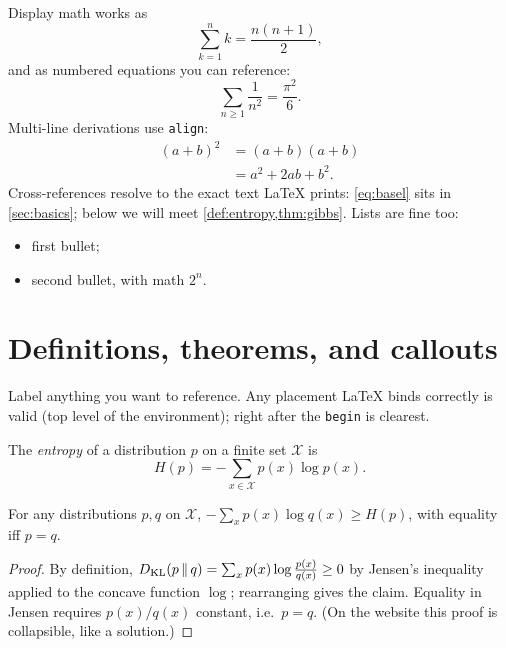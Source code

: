 Display math works as \, \[ \sum_{k=1}^{n} k = \frac{n(n+1)}{2}, \]
and as numbered equations you can reference:
\begin{equation}
  \label{eq:basel}
  \sum_{n \geq 1} \frac{1}{n^2} = \frac{\pi^2}{6}.
\end{equation}
Multi-line derivations use \texttt{align}:
\begin{align}
  (a+b)^2 &= (a+b)(a+b) \\
          &= a^2 + 2ab + b^2.
\end{align}
Cross-references resolve to the exact text LaTeX prints: \cref{eq:basel} sits
in \cref{sec:basics}; below we will meet \cref{def:entropy,thm:gibbs}. Lists
are fine too:
\begin{itemize}
  \item first bullet;
  \item second bullet, with math $2^n$.
\end{itemize}

\section{Definitions, theorems, and callouts}
\label{sec:results}

Label anything you want to reference. Any placement \LaTeX{} binds correctly
is valid (top level of the environment); right after the \texttt{begin} is
clearest.

\begin{definition}[entropy]
\label{def:entropy}
The \emph{entropy} of a distribution $p$ on a finite set $\mathcal{X}$ is
\[ H(p) = -\sum_{x \in \mathcal{X}} p(x) \log p(x). \]
\end{definition}

\begin{theorem}
\label{thm:gibbs}
For any distributions $p, q$ on $\mathcal{X}$,
$-\sum_x p(x) \log q(x) \geq H(p)$, with equality iff $p = q$.
\end{theorem}

\begin{proof}
By definition, $D_{\mathrm{KL}}\!\left(p \,\middle\|\, q\right) = \sum_x p(x) \log \frac{p(x)}{q(x)} \geq 0$ by
Jensen's inequality applied to the concave function $\log$; rearranging gives
the claim. Equality in Jensen requires $p(x)/q(x)$ constant, i.e.\ $p = q$.
(On the website this proof is collapsible, like a solution.)
\end{proof}

